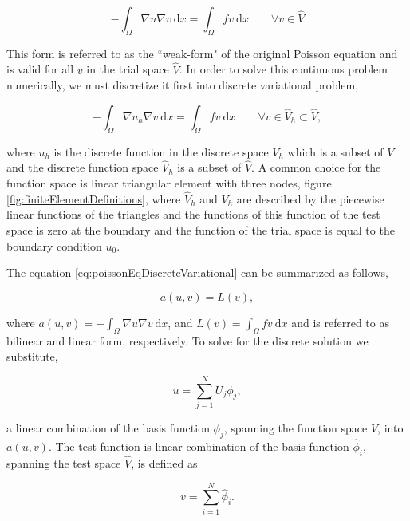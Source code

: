 	\begin{equation}
	- \int_{\Omega} \nabla u \nabla v\ \mathrm{d}x= \int_{\Omega} fv\ \mathrm{d}x \qquad \forall v \in \hat{V}
	\label{eq:poissonEqVariationFormB}
	\end{equation}

This form is referred to as the ``weak-form" of the original Poisson equation and is valid for all $v$ in the trial space $\hat{V}$. In order to solve this continuous problem numerically, we must discretize it first into discrete variational problem,

	\begin{equation}
	- \int_{\Omega} \nabla u_h \nabla v\ \mathrm{d}x= \int_{\Omega} fv\ \mathrm{d}x \qquad \forall v \in \hat{V}_h \subset \hat{V},
	\label{eq:poissonEqDiscreteVariational}
	\end{equation}

where $u_h$ is the discrete function in the discrete space $V_h$ which is a subset of $V$ and the discrete function space $\hat{V}_h$ is a subset of $\hat{V}$. A common choice for the function space is linear triangular element with three nodes, figure \ref{fig:finiteElementDefinitions}, where $\hat{V}_h$ and $V_h$ are described by the piecewise linear functions of the triangles and the functions of this function of the test space is zero at the boundary and the function of the trial space is equal to the boundary condition $u_0$.

The equation \ref{eq:poissonEqDiscreteVariational} can be summarized as follows,

	\begin{equation}
	a\left(u,v\right) = L(v),
	\label{eq:weakForm}
	\end{equation}

where $a\left(u,v\right) = - \int_{\Omega} \nabla u \nabla v\ \mathrm{d}x$, and $L(v)=\int_{\Omega}fv\ \mathrm{d}x$ and is referred to as bilinear and linear form, respectively. To solve for the discrete solution we substitute,
	
	\begin{equation}
	u = \sum_{j=1}^{N} U_j \phi_j,
	\label{eq:trialDiscrete}
	\end{equation}

a linear combination of the basis function $\phi_j$, spanning the function space $V$, into $a\left(u,v\right)$. The test function is linear combination of the basis function $\hat{\phi}_i$, spanning the test space $\hat{V}$, is defined as

	\begin{equation}
	v=\sum_{i=1}^{N} \hat{\phi}_i.
	\label{eq:testDiscrete}
	\end{equation}
	
